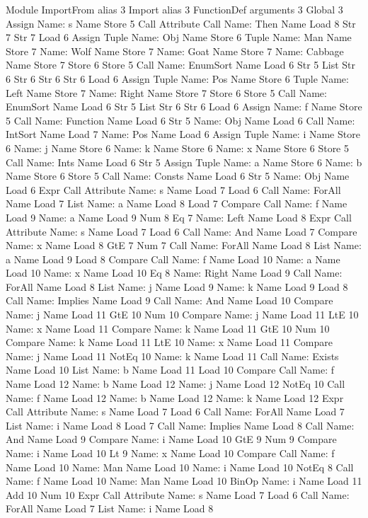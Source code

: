 Module
ImportFrom
alias
3
Import
alias
3
FunctionDef
arguments
3
Global
3
Assign
Name: s
Name
Store
5
Call
Attribute
Call
Name: Then
Name
Load
8
Str
7
Str
7
Load
6
Assign
Tuple
Name: Obj
Name
Store
6
Tuple
Name: Man
Name
Store
7
Name: Wolf
Name
Store
7
Name: Goat
Name
Store
7
Name: Cabbage
Name
Store
7
Store
6
Store
5
Call
Name: EnumSort
Name
Load
6
Str
5
List
Str
6
Str
6
Str
6
Str
6
Load
6
Assign
Tuple
Name: Pos
Name
Store
6
Tuple
Name: Left
Name
Store
7
Name: Right
Name
Store
7
Store
6
Store
5
Call
Name: EnumSort
Name
Load
6
Str
5
List
Str
6
Str
6
Load
6
Assign
Name: f
Name
Store
5
Call
Name: Function
Name
Load
6
Str
5
Name: Obj
Name
Load
6
Call
Name: IntSort
Name
Load
7
Name: Pos
Name
Load
6
Assign
Tuple
Name: i
Name
Store
6
Name: j
Name
Store
6
Name: k
Name
Store
6
Name: x
Name
Store
6
Store
5
Call
Name: Ints
Name
Load
6
Str
5
Assign
Tuple
Name: a
Name
Store
6
Name: b
Name
Store
6
Store
5
Call
Name: Consts
Name
Load
6
Str
5
Name: Obj
Name
Load
6
Expr
Call
Attribute
Name: s
Name
Load
7
Load
6
Call
Name: ForAll
Name
Load
7
List
Name: a
Name
Load
8
Load
7
Compare
Call
Name: f
Name
Load
9
Name: a
Name
Load
9
Num
8
Eq
7
Name: Left
Name
Load
8
Expr
Call
Attribute
Name: s
Name
Load
7
Load
6
Call
Name: And
Name
Load
7
Compare
Name: x
Name
Load
8
GtE
7
Num
7
Call
Name: ForAll
Name
Load
8
List
Name: a
Name
Load
9
Load
8
Compare
Call
Name: f
Name
Load
10
Name: a
Name
Load
10
Name: x
Name
Load
10
Eq
8
Name: Right
Name
Load
9
Call
Name: ForAll
Name
Load
8
List
Name: j
Name
Load
9
Name: k
Name
Load
9
Load
8
Call
Name: Implies
Name
Load
9
Call
Name: And
Name
Load
10
Compare
Name: j
Name
Load
11
GtE
10
Num
10
Compare
Name: j
Name
Load
11
LtE
10
Name: x
Name
Load
11
Compare
Name: k
Name
Load
11
GtE
10
Num
10
Compare
Name: k
Name
Load
11
LtE
10
Name: x
Name
Load
11
Compare
Name: j
Name
Load
11
NotEq
10
Name: k
Name
Load
11
Call
Name: Exists
Name
Load
10
List
Name: b
Name
Load
11
Load
10
Compare
Call
Name: f
Name
Load
12
Name: b
Name
Load
12
Name: j
Name
Load
12
NotEq
10
Call
Name: f
Name
Load
12
Name: b
Name
Load
12
Name: k
Name
Load
12
Expr
Call
Attribute
Name: s
Name
Load
7
Load
6
Call
Name: ForAll
Name
Load
7
List
Name: i
Name
Load
8
Load
7
Call
Name: Implies
Name
Load
8
Call
Name: And
Name
Load
9
Compare
Name: i
Name
Load
10
GtE
9
Num
9
Compare
Name: i
Name
Load
10
Lt
9
Name: x
Name
Load
10
Compare
Call
Name: f
Name
Load
10
Name: Man
Name
Load
10
Name: i
Name
Load
10
NotEq
8
Call
Name: f
Name
Load
10
Name: Man
Name
Load
10
BinOp
Name: i
Name
Load
11
Add
10
Num
10
Expr
Call
Attribute
Name: s
Name
Load
7
Load
6
Call
Name: ForAll
Name
Load
7
List
Name: i
Name
Load
8
